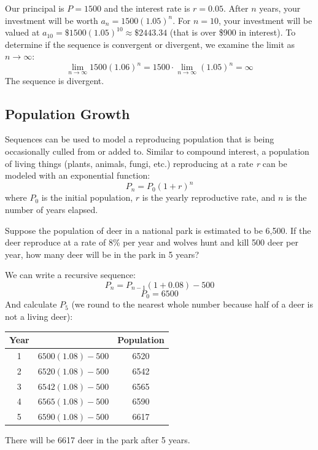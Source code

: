 \begin{Answer}[ref=seqcalc5]
    Our principal is $P = 1500$ and the interest rate is $r = 0.05$. After $n$
    years, your investment will be worth $a_n = 1500(1.05)^{n}$. For $n = 10$,
    your investment will be valued at $a_{10} = \$1500(1.05)^{10} \approx \$2443.34$
    (that is over \$900 in interest). To determine if the sequence is convergent
    or divergent, we examine the limit as $n \to \infty$:
    $$\lim_{n \to \infty} 1500(1.06)^n = 1500\cdot \lim_{n \to \infty}
        (1.05)^n = \infty$$
    The sequence is divergent.
\end{Answer}

\subsection{Population Growth}
Sequences can be used to model a reproducing population that is being
occasionally culled from or added to. Similar to compound interest, a
population of living things (plants, animals, fungi, etc.) reproducing at a
rate \textit{r} can be modeled with an exponential function:
$$P_n = P_0(1+r)^n$$
where $P_0$ is the initial population, $r$ is the yearly reproductive rate,
and $n$ is the number of years elapsed.

\begin{Worked}
\begin{Problem}
Suppose the population of deer in a national park is
estimated to be 6,500. If the deer reproduce at a rate of 8\% per year and
wolves hunt and kill 500 deer per year, how many deer will be in the park in 5
years?
\end{Problem}
\begin{Solution}
We can write a recursive sequence:
$$P_n = P_{n-1}(1 + 0.08) - 500$$
$$P_0 = 6500$$
And calculate $P_5$ (we round to the nearest whole number because half of a
deer is not a living deer):
\begin{center}
    \begin{tabular}{|c|c|c|}\hline
        Year &                    & Population \\
        \hline
        1    & $6500(1.08) - 500$ & 6520       \\
        \hline
        2    & $6520(1.08) - 500$ & 6542       \\
        \hline
        3    & $6542(1.08) - 500$ & 6565       \\
        \hline
        4    & $6565(1.08) - 500$ & 6590       \\
        \hline
        5    & $6590(1.08) - 500$ & 6617       \\
        \hline
    \end{tabular}
\end{center}
There will be 6617 deer in the park after 5 years.
\end{Solution}
\end{Worked}

